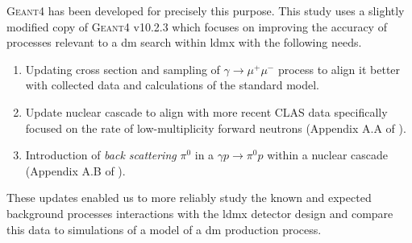 \textsc{Geant4} \cite{geant4} has been developed for precisely this purpose. This study uses a slightly modified copy of \textsc{Geant4} v10.2.3 which focuses on improving the accuracy of processes relevant to a \ac{dm} search within \ac{ldmx} with the following needs.
\begin{enumerate}
  \item Updating cross section and sampling of $\gamma\to\mu^+\mu^-$ process to align it better with
        collected data and calculations of the standard model.
  \item Update nuclear cascade to align with more recent CLAS data specifically focused on the rate of
        low-multiplicity forward neutrons (Appendix A.A of \cite{ldmx-whitepaper}).
  \item Introduction of \emph{back scattering} $\pi^0$ in a $\gamma p \to \pi^0 p$ within a nuclear cascade
        (Appendix A.B of \cite{ldmx-whitepaper}).
\end{enumerate}
These updates enabled us to more reliably study the known and expected background processes interactions with the \ac{ldmx} detector design and compare this data to simulations of a model of a \ac{dm} production process.

